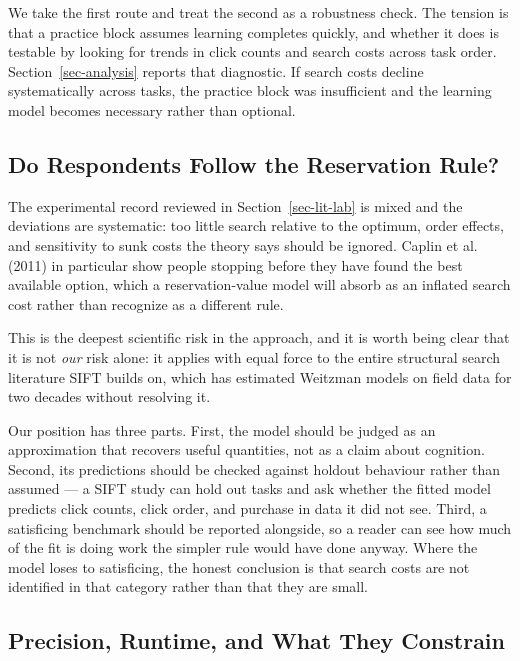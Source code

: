 \documentclass[
  letterpaper,
  DIV=11,
  numbers=noendperiod]{scrartcl}
\begin{document}
We take the first route and treat the second as a robustness check. The
tension is that a practice block assumes learning completes quickly, and
whether it does is testable by looking for trends in click counts and
search costs across task order. Section~\ref{sec-analysis} reports that
diagnostic. If search costs decline systematically across tasks, the
practice block was insufficient and the learning model becomes necessary
rather than optional.

\subsection{Do Respondents Follow the Reservation
Rule?}\label{sec-disc-behavioural}

The experimental record reviewed in Section~\ref{sec-lit-lab} is mixed
and the deviations are systematic: too little search relative to the
optimum, order effects, and sensitivity to sunk costs the theory says
should be ignored. Caplin et al. (2011) in particular show people
stopping before they have found the best available option, which a
reservation-value model will absorb as an inflated search cost rather
than recognize as a different rule.

This is the deepest scientific risk in the approach, and it is worth
being clear that it is not \emph{our} risk alone: it applies with equal
force to the entire structural search literature SIFT builds on, which
has estimated Weitzman models on field data for two decades without
resolving it.

Our position has three parts. First, the model should be judged as an
approximation that recovers useful quantities, not as a claim about
cognition. Second, its predictions should be checked against holdout
behaviour rather than assumed --- a SIFT study can hold out tasks and
ask whether the fitted model predicts click counts, click order, and
purchase in data it did not see. Third, a satisficing benchmark should
be reported alongside, so a reader can see how much of the fit is doing
work the simpler rule would have done anyway. Where the model loses to
satisficing, the honest conclusion is that search costs are not
identified in that category rather than that they are small.

\subsection{Precision, Runtime, and What They
Constrain}\label{sec-disc-estimation}
\end{document}
